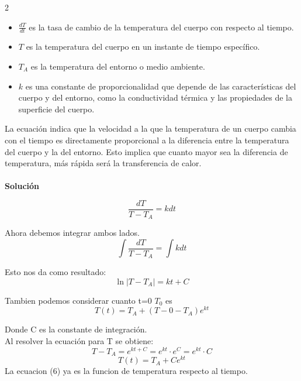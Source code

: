 \documentclass[11pt,letterpaper]{article}
\begin{document}
\begin{multicols}{2}
\begin{itemize}
    \item $\frac{dT}{dt}$  es la tasa de cambio de la temperatura del cuerpo con respecto al tiempo.
    \item $T$ es la temperatura del cuerpo en un instante de tiempo específico.
    \item $T_A$ es la temperatura del entorno o medio ambiente.
    \item $k$ es una constante de proporcionalidad que depende de las características del cuerpo y del entorno, como la conductividad térmica y las propiedades de la superficie del cuerpo.
\end{itemize}

La ecuación indica que la velocidad a la que la temperatura de un cuerpo cambia con el tiempo es directamente proporcional a la diferencia entre la temperatura del cuerpo y la del entorno. Esto implica que cuanto mayor sea la diferencia de temperatura, más rápida será la transferencia de calor.\\

\textbf{\\Solución}

\begin{equation}
    \frac{dT}{T-T_A} = k dt
\end{equation}

Ahora debemos integrar ambos lados.
\begin{equation}
    \int \frac{dT}{T-T_A} = \int k dt
\end{equation}

Esto nos da como resultado:
\begin{equation}
    \ln |T - T_A| = kt + C
\end{equation}

Tambien podemos considerar cuanto t=0  $T_0$ es
\begin{equation}
    T(t) = T_A + (T-0-T_A) e^{kt}
\end{equation}

Donde C es la constante de integración.\\ Al resolver la ecuación para T se obtiene:
\begin{equation}
    T-T_A = e^{kt+C} =e^{kt} \cdot e^{C} = e^{kt} \cdot C
\end{equation}
\begin{equation}
    T(t) = T_A + Ce^{kt}
\end{equation}
La ecuacion (6) ya es la funcion de temperatura respecto al tiempo.\\


\end{multicols}
\end{document}
